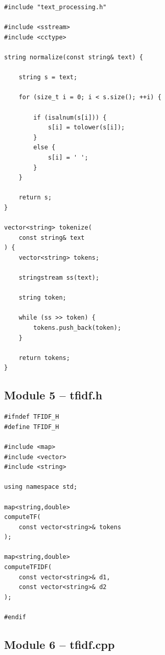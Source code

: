 \begin{lstlisting}
#include "text_processing.h"

#include <sstream>
#include <cctype>

string normalize(const string& text) {

    string s = text;

    for (size_t i = 0; i < s.size(); ++i) {

        if (isalnum(s[i])) {
            s[i] = tolower(s[i]);
        }
        else {
            s[i] = ' ';
        }
    }

    return s;
}

vector<string> tokenize(
    const string& text
) {
    vector<string> tokens;

    stringstream ss(text);

    string token;

    while (ss >> token) {
        tokens.push_back(token);
    }

    return tokens;
}
\end{lstlisting}

\subsection{Module 5 -- tfidf.h}

\begin{lstlisting}
#ifndef TFIDF_H
#define TFIDF_H

#include <map>
#include <vector>
#include <string>

using namespace std;

map<string,double>
computeTF(
    const vector<string>& tokens
);

map<string,double>
computeTFIDF(
    const vector<string>& d1,
    const vector<string>& d2
);

#endif
\end{lstlisting}

\subsection{Module 6 -- tfidf.cpp}

